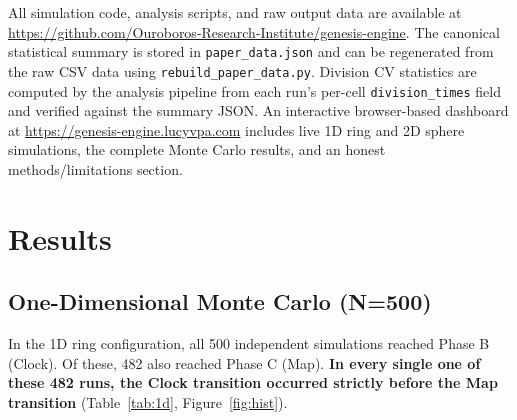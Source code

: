 \documentclass[11pt,letterpaper]{article}
\begin{document}
All simulation code, analysis scripts, and raw output data are available at \url{https://github.com/Ouroboros-Research-Institute/genesis-engine}. The canonical statistical summary is stored in \texttt{paper\_data.json} and can be regenerated from the raw CSV data using \texttt{rebuild\_paper\_data.py}. Division CV statistics are computed by the analysis pipeline from each run's per-cell \texttt{division\_times} field and verified against the summary JSON. An interactive browser-based dashboard at \url{https://genesis-engine.lucyvpa.com} includes live 1D ring and 2D sphere simulations, the complete Monte Carlo results, and an honest methods/limitations section.

\section{Results}

\subsection{One-Dimensional Monte Carlo (N=500)}

In the 1D ring configuration, all 500 independent simulations reached Phase B (Clock). Of these, 482 also reached Phase C (Map). \textbf{In every single one of these 482 runs, the Clock transition occurred strictly before the Map transition} (Table~\ref{tab:1d}, Figure~\ref{fig:hist}).
\end{document}
